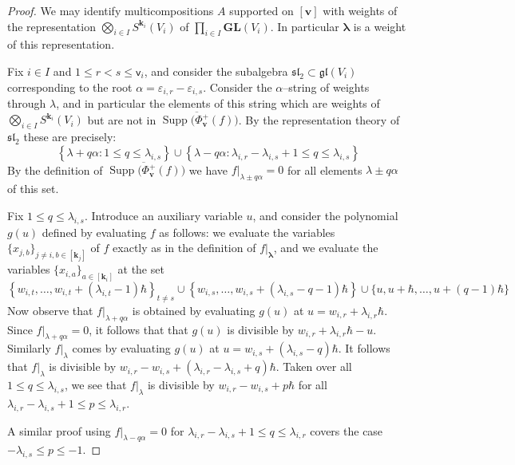 \documentclass[11pt,reqno]{amsart}
\renewcommand{\mathbf}{\mathbold}
\numberwithin{equation}{section}
\theoremstyle{definition}
\newcommand{\bk}{\mathbf{k}}
\newcommand{\bv}{\mathbf{v}}
\newcommand{\eps}{\varepsilon}
\DeclareMathOperator{\supp}{Supp}
\newcommand{\GL}{\mathbf{GL}}
\newcommand{\fsl}{\mathfrak{sl}}
\renewcommand{\bv}{\mathbf{v}} %
\newcommand{\sv}{\mathsf{v}}
\newcommand{\vertexset}{I}
\newcommand{\bla}{{\boldsymbol{\lambda}}}
\begin{document}
\begin{proof}
We may identify multicompositions $A$ supported on $[\bv]$ with weights  of the representation $\bigotimes_{i \in \vertexset} S^{\bk_i}(V_i)$ of $\prod_{i \in \vertexset} \GL(V_i)$. In particular $\bla$ is a weight of this representation. 

Fix $i \in \vertexset$ and $1 \leq r < s \leq \sv_i$, and consider the subalgebra $\fsl_2 \subset \mathfrak{gl}(V_i)$ corresponding to the root $\alpha = \eps_{i,r} - \eps_{i,s}$. Consider  the $\alpha$--string of weights through $\lambda$, and in particular the elements of this string which are weights of $\bigotimes_{i \in \vertexset} S^{\bk_i}(V_i)$  but are not in $\overline{\supp(\Phi^+_\bv(f)})$.  By the representation theory of $\fsl_2$ these are precisely:
\begin{equation}
\label{eq:outside Vla}
\left\{ \lambda + q \alpha : 1 \leq q \leq \lambda_{i,s} \right\} \cup \left\{ \lambda - q \alpha : \lambda_{i,r} -\lambda_{i,s} + 1 \leq q \leq \lambda_{i,s} \right\}
\end{equation}
By the definition of $\overline{\supp(\Phi^+_\bv(f)})$ we  have $f|_{\lambda\pm q \alpha} = 0$ for all  elements $\lambda \pm q \alpha$ of this set. 

Fix $1 \leq q \leq \lambda_{i,s}$.  Introduce an auxiliary variable $u$, and consider the polynomial $g(u)$ defined by evaluating $f$ as follows: we evaluate the variables $\{x_{j,b}\}_{j \neq i, b \in [\bk_j]}$ of $f$ exactly as in the definition of $f|_\bla$, and we evaluate the variables $\{x_{i,a}\}_{a \in [\bk_i]}$ at the set
$$
\left\{w_{i,t},\ldots,w_{i,t} + (\lambda_{i,t}-1)\hbar\right\}_{t \neq s}\cup \left\{ w_{i,s}, \ldots, w_{i,s} + (\lambda_{i,s}-q-1)\hbar\right\} \cup \{u, u+\hbar,\ldots, u+(q-1)\hbar\}
$$
Now observe that  $f|_{\lambda+q\alpha} $ is obtained by evaluating $g(u)$ at $u = w_{i,r}+\lambda_{i,r} \hbar$. Since $f|_{\lambda+q\alpha} =0$, it follows that that $g(u)$ is divisible by $w_{i,r} + \lambda_{i,r} \hbar - u$.  Similarly $f|_\lambda$ comes by evaluating $g(u)$ at $u = w_{i,s} + (\lambda_{i,s}-q)\hbar$. It follows that $f|_\lambda$ is divisible by $w_{i,r} - w_{i,s} + (\lambda_{i,r} - \lambda_{i,s} +q)\hbar$.  
Taken over all $1 \leq q \leq \lambda_{i,s}$, we see that  $f|_\lambda$  is divisible by $w_{i,r}-w_{i,s} + p\hbar$ for all $\lambda_{i,r}-\lambda_{i,s}+1 \leq p \leq \lambda_{i,r}$. 

A similar proof using $f|_{\lambda - q\alpha} = 0$ for $\lambda_{i,r} -\lambda_{i,s}+1 \leq q \leq \lambda_{i,r}$ covers the case  $-\lambda_{i,s} \leq p \leq -1$.
\end{proof}
\end{document}
